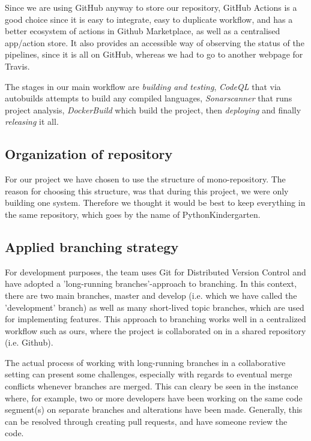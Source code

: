 Since we are using GitHub anyway to store our repository, GitHub Actions is a good choice since it is easy to 
integrate, easy to duplicate workflow, and has a better ecosystem of actions in Github Marketplace, as well as a centralised app/action store. 
It also provides an accessible way of observing the status of the pipelines, since it is all on GitHub, whereas we had to go to another webpage for Travis.  

The stages in our main workflow are \textit{building and testing}, \textit{CodeQL} that via autobuilds attempts to build any compiled languages, \textit{Sonarscanner} that runs project analysis, \textit{DockerBuild} which build the project, then \textit{deploying} and finally \textit{releasing} it all.\newline

\subsection{Organization of repository} %
For our project we have chosen to use the structure of mono-repository. 
The reason for choosing this structure, was that during this project, we were only building one system. 
Therefore we thought it would be best to keep everything in the same repository, which goes by the name of PythonKindergarten. \newline
  
  
\subsection{Applied branching strategy}
For development purposes, the team uses Git for Distributed Version Control and have adopted a 'long-running branches'-approach to branching. \cite{lecture02}
In this context, there are two main branches, master and develop (i.e. which we have called the 'development' branch) as well as many short-lived topic branches, 
which are used for implementing features. This approach to branching works well in a centralized workflow such as ours, where the project is collaborated on in a shared repository (i.e. Github).

The actual process of working with long-running branches in a collaborative setting can present some challenges, especially with regards to eventual merge conflicts whenever branches are merged. 
This can cleary be seen in the instance where, for example, two or more developers have been working on the same code segment(s) on separate branches and alterations have been made. 
Generally, this can be resolved through creating pull requests, and have someone review the code.

